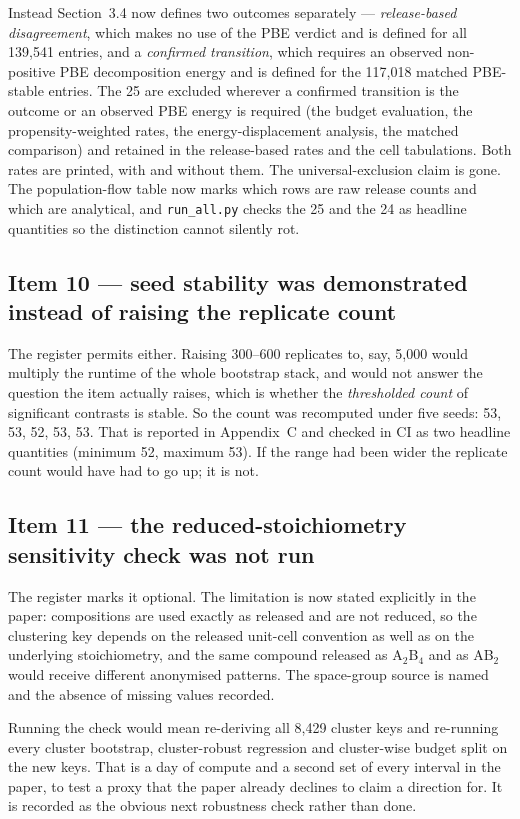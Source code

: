 \documentclass[11pt]{article}
\begin{document}
Instead Section~3.4 now defines two outcomes separately --- \emph{release-based
disagreement}, which makes no use of the PBE verdict and is defined for all 139{,}541
entries, and a \emph{confirmed transition}, which requires an observed non-positive PBE
decomposition energy and is defined for the 117{,}018 matched PBE-stable entries. The 25 are
excluded wherever a confirmed transition is the outcome or an observed PBE energy is
required (the budget evaluation, the propensity-weighted rates, the energy-displacement
analysis, the matched comparison) and retained in the release-based rates and the cell
tabulations. Both rates are printed, with and without them. The universal-exclusion claim is
gone. The population-flow table now marks which rows are raw release counts and which are
analytical, and \texttt{run\_all.py} checks the 25 and the 24 as headline quantities so the
distinction cannot silently rot.

\subsection*{Item 10 --- seed stability was demonstrated instead of raising the replicate count}

The register permits either. Raising 300--600 replicates to, say, 5{,}000 would multiply the
runtime of the whole bootstrap stack, and would not answer the question the item actually
raises, which is whether the \emph{thresholded count} of significant contrasts is stable. So
the count was recomputed under five seeds: 53, 53, 52, 53, 53. That is reported in
Appendix~C and checked in CI as two headline quantities (minimum 52, maximum 53). If the
range had been wider the replicate count would have had to go up; it is not.

\subsection*{Item 11 --- the reduced-stoichiometry sensitivity check was not run}

The register marks it optional. The limitation is now stated explicitly in the paper:
compositions are used exactly as released and are not reduced, so the clustering key depends
on the released unit-cell convention as well as on the underlying stoichiometry, and the
same compound released as A$_2$B$_4$ and as AB$_2$ would receive different anonymised
patterns. The space-group source is named and the absence of missing values recorded.

Running the check would mean re-deriving all 8{,}429 cluster keys and re-running every
cluster bootstrap, cluster-robust regression and cluster-wise budget split on the new keys.
That is a day of compute and a second set of every interval in the paper, to test a proxy
that the paper already declines to claim a direction for. It is recorded as the obvious next
robustness check rather than done.
\end{document}
